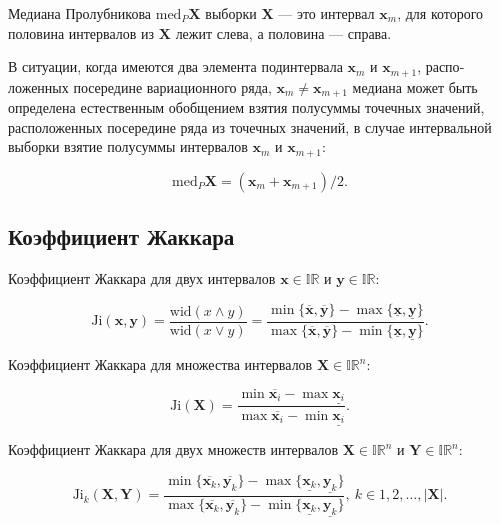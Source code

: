 \documentclass{article}
\begin{document}
  Медиана Пролубникова \( \text{med}_P \mathbf{X} \) выборки
  \( \mathbf{X} \) --- это интервал \( \mathbf{x}_m \), для которого
  половина интервалов из \( \mathbf{X} \) лежит слева, а половина
  --- справа.

  В ситуации, когда имеются два элемента подинтервала \( \mathbf{x}_m \)
  и \( \mathbf{x}_{m+1} \), распо­ложенных посередине вариационного ряда,
  \( \mathbf{x}_m \ne \mathbf{x}_{m+1} \) медиана может быть определена
  естественным обобщением взятия полусуммы точечных значений,
  расположенных посередине ряда из точечных значений, в случае
  интервальной выборки взятие полусуммы интервалов \( \mathbf{x}_m \)
  и \( \mathbf{x}_{m+1} \):

  \begin{equation}
    \text{med}_P \mathbf{X} = (\mathbf{x}_m + \mathbf{x}_{m+1}) / 2.
  \end{equation}

  \subsection{Коэффициент Жаккара}

  Коэффициент Жаккара для двух интервалов \( \mathbf{x} \in \mathbb{IR} \)
  и \( \mathbf{y} \in \mathbb{IR} \):

  \begin{equation}
    \text{Ji} (\mathbf{x}, \mathbf{y})
      = \frac{\text{wid} (x \land y)}{\text{wid} (x \lor y)}
      = \frac{\min \{ \overline{\mathbf{x}}, \overline{\mathbf{y}} \} - \max \{ \underline{\mathbf{x}}, \underline{\mathbf{y}} \}}
        {\max\{ \overline{\mathbf{x}}, \overline{\mathbf{y}} \} - \min \{ \underline{\mathbf{x}}, \underline{\mathbf{y}} \}}.
  \end{equation}

  Коэффициент Жаккара для множества интервалов
  \( \mathbf{X} \in \mathbb{IR}^n \):

  \begin{equation}
    \text{Ji} (\mathbf{X})
      = \frac{\min \overline{\mathbf{x}_i} - \max \underline{\mathbf{x}_i}}
        {\max \overline{\mathbf{x}_i} - \min \underline{\mathbf{x}_i}}.
  \end{equation}

  Коэффициент Жаккара для двух множеств интервалов
  \( \mathbf{X} \in \mathbb{IR}^n \) и \( \mathbf{Y} \in \mathbb{IR}^n \):

  \begin{equation}
    \text{Ji}_k (\mathbf{X}, \mathbf{Y})
      = \frac{\min \{ \overline{\mathbf{x}_k}, \overline{\mathbf{y}_k} \} - \max \{ \underline{\mathbf{x}_k}, \underline{\mathbf{y}_k} \}}
        {\max\{ \overline{\mathbf{x}_k}, \overline{\mathbf{y}_k} \} - \min \{ \underline{\mathbf{x}_k}, \underline{\mathbf{y}_k} \}},
      \ k \in 1, 2, \dots, |\mathbf{X}|.
  \end{equation}
\end{document}
